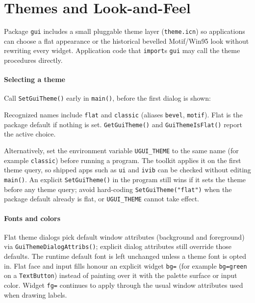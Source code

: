 \section{Themes and Look-and-Feel}

Package \texttt{gui} includes a small pluggable theme layer
(\texttt{theme.icn}) so applications can choose a flat
appearance or the historical bevelled Motif/Win95 look without
rewriting every widget. Application code that \texttt{import}s
\texttt{gui} may call the theme procedures directly.

\paragraph{Selecting a theme}

Call \texttt{SetGuiTheme()} early in \texttt{main()}, before the
first dialog is shown:


\noindent
Recognized names include \texttt{flat} and \texttt{classic}
(aliases \texttt{bevel}, \texttt{motif}). Flat is the package
default if nothing is set.
\texttt{GetGuiTheme()} and \texttt{GuiThemeIsFlat()} report the
active choice.

Alternatively, set the environment variable \texttt{UGUI\_THEME} to the
same name (for example \texttt{classic}) before running a program.
The toolkit applies it on the first theme query, so shipped apps such
as \texttt{ui} and \texttt{ivib} can be checked without editing
\texttt{main()}. An explicit \texttt{SetGuiTheme()} in the program
still wins if it sets the theme before any theme query; avoid
hard-coding \texttt{SetGuiTheme("flat")} when the package default
already is flat, or \texttt{UGUI\_THEME} cannot take effect.

\paragraph{Fonts and colors}

Flat theme dialogs pick default window attributes (background and
foreground) via \texttt{GuiThemeDialogAttribs()}; explicit dialog
attributes still override those defaults. The runtime default font is
left unchanged unless a theme font is opted in. Flat face and input
fills honour an explicit widget \texttt{bg=} (for example
\texttt{bg=green} on a \texttt{TextButton}) instead of painting over
it with the palette surface or input color. Widget \texttt{fg=}
continues to apply through the usual window attributes used when
drawing labels.


